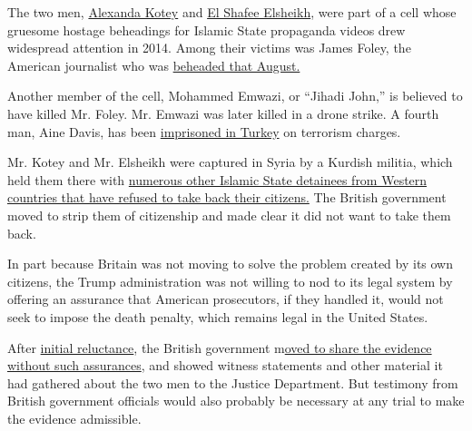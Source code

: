 The two men,
\href{https://www.washingtonpost.com/world/national-security/another-islamic-state-jailer-who-held-western-hostages-identified-as-londoner/2016/02/06/a0f11d28-cc10-11e5-ae11-57b6aeab993f_story.html?utm_term=.cdee9a6a6ebf}{Alexanda
Kotey} and
\href{https://www.washingtonpost.com/world/national-security/that-is-not-the-son-i-raised-how-a-british-citizen-became-one-of-the-most-notorious-members-of-isis/2016/05/23/6d66276c-1cfd-11e6-b6e0-c53b7ef63b45_story.html?utm_term=.d86c7802d277}{El
Shafee Elsheikh}, were part of a cell whose gruesome hostage beheadings
for Islamic State propaganda videos drew widespread attention in 2014.
Among their victims was James Foley, the American journalist who was
\href{https://www.nytimes3xbfgragh.onion/2014/08/20/world/middleeast/isis-james-foley-syria-execution.html?module=inline}{beheaded
that August.}

Another member of the cell, Mohammed Emwazi, or ``Jihadi John,'' is
believed to have killed Mr. Foley. Mr. Emwazi was later killed in a
drone strike. A fourth man, Aine Davis, has been
\href{https://www.theguardian.com/world/2017/may/09/british-jihadist-aine-davis-convicted-in-turkey-on-terror-charges}{imprisoned
in Turkey} on terrorism charges.

Mr. Kotey and Mr. Elsheikh were captured in Syria by a Kurdish militia,
which held them there with
\href{https://www.nytimes3xbfgragh.onion/2018/07/18/world/middleeast/islamic-state-detainees-syria-prisons.html?action=click\&module=RelatedCoverage\&pgtype=Article\&region=Footer}{numerous
other Islamic State detainees from Western countries that have refused
to take back their citizens.} The British government moved to strip them
of citizenship and made clear it did not want to take them back.

In part because Britain was not moving to solve the problem created by
its own citizens, the Trump administration was not willing to nod to its
legal system by offering an assurance that American prosecutors, if they
handled it, would not seek to impose the death penalty, which remains
legal in the United States.

After
\href{https://www.nytimes3xbfgragh.onion/2018/02/28/us/politics/britain-death-penalty-isis.html}{initial
reluctance}, the British government
m\href{https://www.nytimes3xbfgragh.onion/2019/01/18/us/politics/british-isis-prosecution-beatles.html}{oved
to share the evidence without such assurances}, and showed witness
statements and other material it had gathered about the two men to the
Justice Department. But testimony from British government officials
would also probably be necessary at any trial to make the evidence
admissible.


